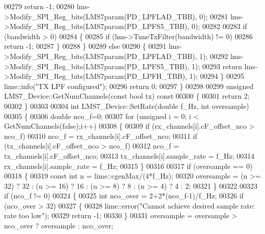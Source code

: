 \begin{DoxyCode}
00279             \textcolor{keywordflow}{return} -1;
00280         lms->Modify_SPI_Reg_bits(LMS7param(PD_LPFLAD_TBB), 0);
00281         lms->Modify_SPI_Reg_bits(LMS7param(PD_LPFS5_TBB), 0);
00282 
00283             \textcolor{keywordflow}{if} (bandwidth > 0)
00284             \{
00285                 \textcolor{keywordflow}{if} (lms->TuneTxFilter(bandwidth) != 0)
00286                     \textcolor{keywordflow}{return} -1;
00287             \}
00288     \}
00289     \textcolor{keywordflow}{else}
00290     \{
00291         lms->Modify_SPI_Reg_bits(LMS7param(PD_LPFLAD_TBB), 1);
00292         lms->Modify_SPI_Reg_bits(LMS7param(PD_LPFS5_TBB), 1);
00293         \textcolor{keywordflow}{return} lms->Modify_SPI_Reg_bits(LMS7param(PD_LPFH_TBB), 1);
00294     \}
00295     lime::info(\textcolor{stringliteral}{"TX LPF configured"});
00296     \textcolor{keywordflow}{return} 0;
00297 \}
00298 
00299 \textcolor{keywordtype}{unsigned} LMS7_Device::GetNumChannels(\textcolor{keyword}{const} \textcolor{keywordtype}{bool} tx)\textcolor{keyword}{ const}
00300 \textcolor{keyword}{}\{
00301     \textcolor{keywordflow}{return} 2;
00302 \}
00303 
00304 \textcolor{keywordtype}{int} LMS7_Device::SetRate(\textcolor{keywordtype}{double} f\_Hz, \textcolor{keywordtype}{int} oversample)
00305 \{
00306     \textcolor{keywordtype}{double} nco\_f=0;
00307     \textcolor{keywordflow}{for} (\textcolor{keywordtype}{unsigned} i = 0; i < GetNumChannels(\textcolor{keyword}{false});i++)
00308     \{
00309          \textcolor{keywordflow}{if} (rx_channels[i].cF\_offset\_nco > nco\_f)
00310              nco\_f = rx_channels[i].cF\_offset\_nco;
00311          \textcolor{keywordflow}{if} (tx_channels[i].cF\_offset\_nco > nco\_f)
00312              nco\_f = tx_channels[i].cF\_offset\_nco;
00313          tx_channels[i].sample\_rate = f\_Hz;
00314          rx_channels[i].sample\_rate = f\_Hz;
00315     \}
00316 
00317     \textcolor{keywordflow}{if} (oversample == 0)
00318     \{
00319         \textcolor{keyword}{const} \textcolor{keywordtype}{int} n = lime::cgenMax/(4*f\_Hz);
00320         oversample = (n >= 32) ? 32 : (n >= 16) ? 16 : (n >= 8) ? 8 : (n >= 4) ? 4 : 2;
00321     \}
00322 
00323     \textcolor{keywordflow}{if} (nco\_f != 0)
00324     \{
00325         \textcolor{keywordtype}{int} nco\_over = 2+2*(nco\_f-1)/f\_Hz;
00326         \textcolor{keywordflow}{if} (nco\_over > 32)
00327         \{
00328             lime::error(\textcolor{stringliteral}{"Cannot achieve desired sample rate: rate too low"});
00329             \textcolor{keywordflow}{return} -1;
00330         \}
00331         oversample = oversample > nco\_over ? oversample : nco\_over;

\end{DoxyCode}

